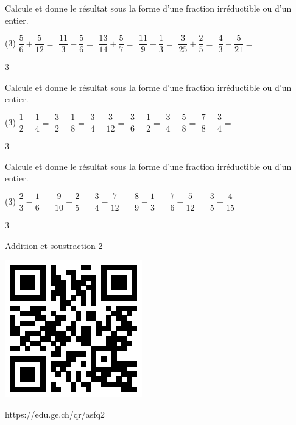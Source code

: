 \documentclass[a4paper,11pt]{report}
\begin{document}
\begin{exo}
{Calcule et donne le résultat sous la forme d'une fraction irréductible ou d'un entier. 

\begin{tasks}(3)
 \task $\dfrac{5}{6}+\dfrac{5}{12}=$
  \task $\dfrac{11}{3}-\dfrac{5}{6}=$
 \task $\dfrac{13}{14}+\dfrac{5}{7}=$
  \task $\dfrac{11}{9}-\dfrac{1}{3}=$  
  \task $\dfrac{3}{25}+\dfrac{2}{5}=$  
  \task $\dfrac{4}{3}-\dfrac{5}{21}=$  
\end{tasks}    
\vspace{-0.2cm}
}{3}
\end{exo}

\begin{exo}
{Calcule et donne le résultat sous la forme d'une fraction irréductible ou d'un entier.

\begin{tasks}(3)
\task $\dfrac{1}{2}-\dfrac{1}{4}=$
\task $\dfrac{3}{2}-\dfrac{1}{8}=$
\task $\dfrac{3}{4}-\dfrac{3}{12}=$
\task $\dfrac{3}{6}-\dfrac{1}{2}=$
\task $\dfrac{3}{4}-\dfrac{5}{8}=$
\task $\dfrac{7}{8}-\dfrac{3}{4}=$
\end{tasks}
\vspace{-0.2cm}
}
{3}
\end{exo}

\begin{exo}
{Calcule et donne le résultat sous la forme d'une fraction irréductible ou d'un entier.

\begin{tasks}(3)
\task $\dfrac{2}{3}-\dfrac{1}{6}=$
\task $\dfrac{9}{10}-\dfrac{2}{5}=$
\task $\dfrac{3}{4}-\dfrac{7}{12}=$
\task $\dfrac{8}{9}-\dfrac{1}{3}=$
\task $\dfrac{7}{6}-\dfrac{5}{12}=$
\task $\dfrac{3}{5}-\dfrac{4}{15}=$
\end{tasks}
\vspace{-0.2cm}
}
{3}
\end{exo}

\begin{qmun}{Addition et soustraction 2}{
		\begin{center}
\includegraphics[scale=1]{media/qr/asfq2}

\tiny{{https://edu.ge.ch/qr/asfq2}}
		\end{center}
	}
\end{qmun}
\end{document}
